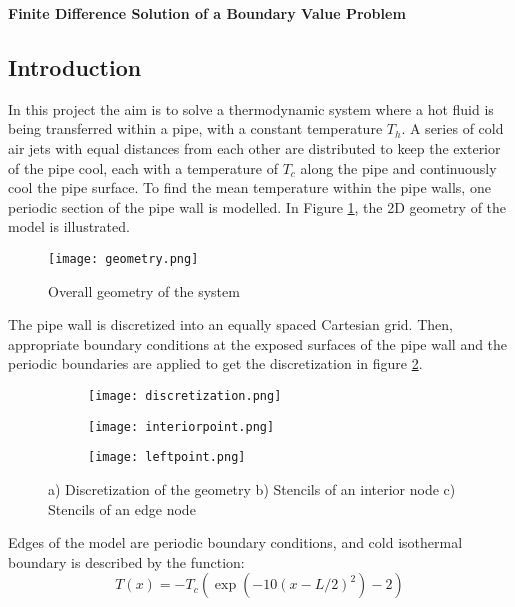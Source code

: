 \documentclass[10pt]{article}
\begin{document}
\begin{center}
    \large \textbf{Finite Difference Solution of a Boundary Value Problem}
\end{center}

\subsection*{Introduction}

In this project the aim is to solve a thermodynamic system where a hot fluid is being transferred within a pipe, with a constant temperature $T_h$. A series of cold air jets with equal distances from each other are distributed to keep the exterior of the pipe cool, each with a temperature of $T_c$ along the pipe and continuously cool the pipe surface. To find the mean temperature within the pipe walls, one periodic section of the pipe wall is modelled. In Figure \ref{geom}, the 2D geometry of the model is illustrated. 

\begin{figure}[h!]
  \centering
  \texttt{[image: geometry.png]}
    \caption{Overall geometry of the system \cite{p2}}
  \label{geom}
\end{figure}

The pipe wall is discretized into an equally spaced Cartesian grid. Then, appropriate boundary conditions at the exposed surfaces of the pipe wall and the periodic boundaries are applied to get the discretization in figure \ref{disc}.

\begin{figure}[ht]
\begin{subfigure}{.38\textwidth}
  \centering
  \texttt{[image: discretization.png]}  
  \caption{}
  \label{disc}
\end{subfigure}
\begin{subfigure}{.3\textwidth}
  \centering
  \texttt{[image: interiorpoint.png]}  
  \caption{}
  \label{fig:fully-bended-mesh}
\end{subfigure}
\begin{subfigure}{.3\textwidth}
  \centering
  \texttt{[image: leftpoint.png]}  
  \caption{}
  \label{fig:zoom-mesh}
\end{subfigure}
\caption{a) Discretization of the geometry b) Stencils of an interior node c) Stencils of an edge node \cite{p2}}
\label{fig:mesh}
\end{figure}
Edges of the model are periodic boundary conditions, and cold isothermal boundary is described by the function:
$$T(x)=-T_{c}\left(\exp \left(-10(x-L / 2)^{2}\right)-2\right)$$
\end{document}
